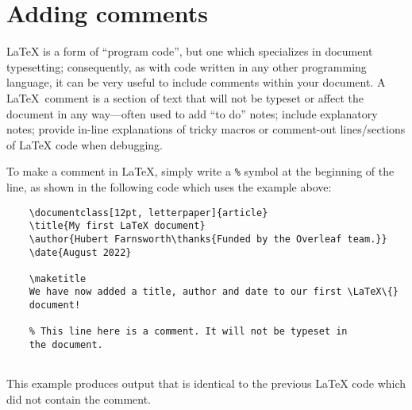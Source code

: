 \section{Adding comments}

LaTeX is a form of “program code”, but one which specializes in document typesetting; consequently, as with code written in any other programming language, it can be very useful to include comments within your document. A \LaTeX\ comment is a section of text that will not be typeset or affect the document in any way—often used to add “to do” notes; include explanatory notes; provide in-line explanations of tricky macros or comment-out lines/sections of LaTeX code when debugging.

To make a comment in \LaTeX, simply write a \verb|%| symbol at the beginning of the line, as shown in the following code which uses the example above:

\begin{tcolorbox}
\begin{verbatim}
    \documentclass[12pt, letterpaper]{article}
    \title{My first LaTeX document}
    \author{Hubert Farnsworth\thanks{Funded by the Overleaf team.}}
    \date{August 2022}
    
    \maketitle
    We have now added a title, author and date to our first \LaTeX\{} 
    document!

    % This line here is a comment. It will not be typeset in 
    the document.
    
\end{verbatim}
\end{tcolorbox}

This example produces output that is identical to the previous LaTeX code which did not contain the comment.